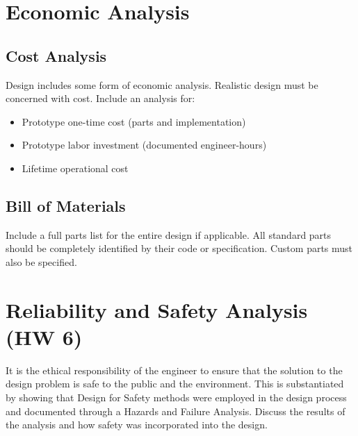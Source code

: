 \documentclass[12pt]{article}
\begin{document}
\section{Economic Analysis}
\subsection{Cost Analysis}
Design includes some form of economic analysis. Realistic design must be concerned with cost. Include an analysis for:
\begin{itemize}[noitemsep]
    \item Prototype one-time cost (parts and implementation)
    \item Prototype labor investment (documented engineer-hours)
    \item Lifetime operational cost
\end{itemize}

\subsection{Bill of Materials}
Include a full parts list for the entire design if applicable. All standard parts should be completely identified by their code or specification. Custom parts must also be specified.

\section{Reliability and Safety Analysis (HW 6)}
It is the ethical responsibility of the engineer to ensure that the solution to the design problem is safe to the public and the environment. This is substantiated by showing that Design for Safety methods were employed in the design process and documented through a Hazards and Failure Analysis. Discuss the results of the analysis and how safety was incorporated into the design.

\end{document}

